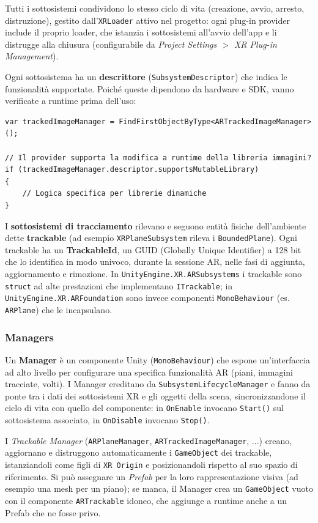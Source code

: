 Tutti i sottosistemi condividono lo stesso ciclo di vita (creazione, avvio, arresto, distruzione), gestito dall'\texttt{XRLoader} attivo nel progetto: ogni plug-in provider include il proprio loader, che istanzia i sottosistemi all'avvio dell'app e li distrugge alla chiusura (configurabile da \textit{Project Settings $>$ XR Plug-in Management}).

Ogni sottosistema ha un \textbf{descrittore} (\texttt{SubsystemDescriptor}) che indica le funzionalità supportate. Poiché queste dipendono da hardware e SDK, vanno verificate a runtime prima dell'uso:

\begin{lstlisting}[language={[Sharp]C}]
var trackedImageManager = FindFirstObjectByType<ARTrackedImageManager>();

// Il provider supporta la modifica a runtime della libreria immagini?
if (trackedImageManager.descriptor.supportsMutableLibrary)
{
    // Logica specifica per librerie dinamiche
}
\end{lstlisting}

I \textbf{sottosistemi di tracciamento} rilevano e seguono entità fisiche dell'ambiente dette \textbf{trackable} (ad esempio \texttt{XRPlaneSubsystem} rileva i \texttt{BoundedPlane}). Ogni trackable ha un \textbf{TrackableId}, un GUID (Globally Unique Identifier) a 128 bit che lo identifica in modo univoco, durante la sessione AR, nelle fasi di aggiunta, aggiornamento e rimozione. In \texttt{UnityEngine.XR.ARSubsystems} i trackable sono \texttt{struct} ad alte prestazioni che implementano \texttt{ITrackable}; in \texttt{UnityEngine.XR.ARFoundation} sono invece componenti \texttt{MonoBehaviour} (es. \texttt{ARPlane}) che le incapsulano.

\subsubsection{Managers}
Un \textbf{Manager} è un componente Unity (\texttt{MonoBehaviour}) che espone un'interfaccia ad alto livello per configurare una specifica funzionalità AR (piani, immagini tracciate, volti). I Manager ereditano da \texttt{SubsystemLifecycleManager} e fanno da ponte tra i dati dei sottosistemi XR e gli oggetti della scena, sincronizzandone il ciclo di vita con quello del componente: in \texttt{OnEnable} invocano \texttt{Start()} sul sottosistema associato, in \texttt{OnDisable} invocano \texttt{Stop()}.

I \textit{Trackable Manager} (\texttt{ARPlaneManager}, \texttt{ARTrackedImageManager}, ...) creano, aggiornano e distruggono automaticamente i \texttt{GameObject} dei trackable, istanziandoli come figli di \texttt{XR Origin} e posizionandoli rispetto al suo spazio di riferimento. Si può assegnare un \textit{Prefab} per la loro rappresentazione visiva (ad esempio una mesh per un piano); se manca, il Manager crea un \texttt{GameObject} vuoto con il componente \texttt{ARTrackable} idoneo, che aggiunge a runtime anche a un Prefab che ne fosse privo.

